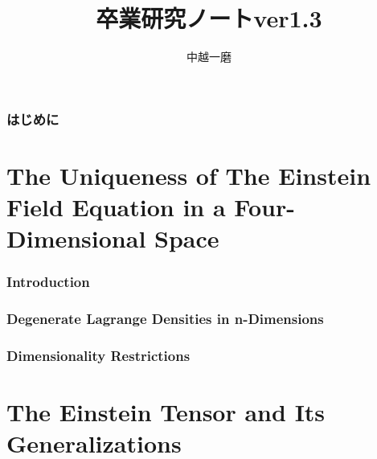 \documentclass[a4j, 12pt]{jsarticle}
\title{卒業研究ノートver1.3}
\author{中越一磨}
\begin{document}
\maketitle
\begin{abstract}
    
\end{abstract}

\tableofcontents
\clearpage

\section*{はじめに}


\part{The Uniqueness of The Einstein Field Equation in a Four-Dimensional Space}

\section{Introduction}


\section{Degenerate Lagrange Densities in n-Dimensions}


\section{Dimensionality Restrictions}

\clearpage
\part{The Einstein Tensor and Its Generalizations}
\end{document}
